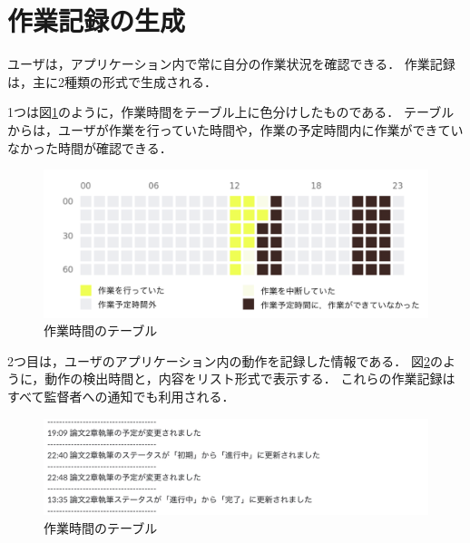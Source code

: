 \section{作業記録の生成}
ユーザは，アプリケーション内で常に自分の作業状況を確認できる．
作業記録は，主に2種類の形式で生成される．

1つは図\ref{fig:activity_table}のように，作業時間をテーブル上に色分けしたものである．
テーブルからは，ユーザが作業を行っていた時間や，作業の予定時間内に作業ができていなかった時間が確認できる．

\begin{figure}[h]
  \begin{center}
  \includegraphics[width=12.0cm]{graphics/activity_table.png}
  \caption{作業時間のテーブル}
  \label{fig:activity_table}
  \end{center}
\end{figure}

\clearpage

2つ目は，ユーザのアプリケーション内の動作を記録した情報である．
図\ref{fig:activity_log}のように，動作の検出時間と，内容をリスト形式で表示する．
これらの作業記録はすべて監督者への通知でも利用される．

\begin{figure}[h]
  \begin{center}
  \includegraphics[width=14.0cm]{graphics/activity_log.png}
  \caption{作業時間のテーブル}
  \label{fig:activity_log}
  \end{center}
\end{figure}


